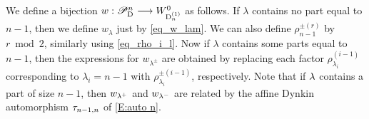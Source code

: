\documentclass[a4paper]{amsart}
\newcommand{\ike}[1]{\todo[size=\tiny,color=blue!30]{#1}}
\theoremstyle{remark}
\numberwithin{equation}{section}
\begin{document}
We define a bijection $w:\mathscr{P}_{\mathrm{D}_{}}^{n}\longrightarrow W_{\mathrm{D}_{n}^{(1)}}^0$ as follows. 
If \(\lambda\) contains no part equal to \(n-1\), 
then we define $w_\lambda$ 
just by \eqref{eq_w_lam}. 
We can also define \(\rho_{n-1}^{\pm(r)}\) by \(r\bmod2\), similarly using \eqref{eq_rho_i_l}. Now if \(\lambda\) contains some parts equal to \(n-1\), then the expressions for \(w_{\lambda^\pm}\) are obtained by replacing each factor \(\rho_{\lambda_i}^{(i-1)}\) corresponding to \(\lambda_i=n-1\) with \(\rho_{\lambda_i}^{\pm(i-1)}\), respectively. Note that if $\lambda$ contains a part of size $n-1$, then $w_{\lambda^+}$ and $w_{\lambda^-}$ are related by the affine Dynkin automorphism $\tau_{n-1,n}$ of \eqref{E:auto n}.
\end{document}
